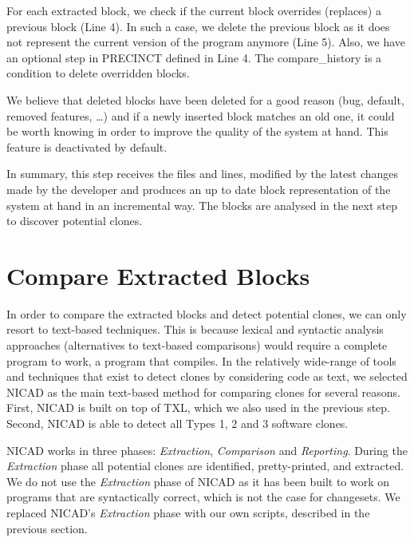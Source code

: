 For each extracted block, we check if the current block overrides (replaces) a previous block (Line 4).
In such a case, we delete the previous block as it does not represent the current version of the program anymore (Line 5).
Also, we have an optional step in PRECINCT defined in Line 4. The compare\_history is a condition to delete overridden blocks.

We believe that deleted blocks have been deleted for a good reason (bug, default, removed features, \ldots) and if a newly inserted block matches an old one, it could be worth knowing in order to improve the quality of the system at hand.
This feature is deactivated by default.

In summary, this step receives the files and lines, modified by the latest changes made by the developer and produces an up to date block representation of the system at hand in an incremental way.
The blocks are analysed in the next step to discover potential clones.

\section{Compare Extracted Blocks}
\label{sub:Compare Extracted Blocks}

In order to compare the extracted blocks and detect potential clones, we can only resort to text-based techniques.
This is because lexical and syntactic analysis approaches (alternatives to text-based comparisons) would require a complete program to work, a program that compiles.
In the relatively wide-range of tools and techniques that exist to detect clones by considering code as text\cite{Johnson1993,Johnson1994,Marcus,Manber1994,StephaneDucasse,Wettel2005}, we selected NICAD as the main text-based method for comparing clones \cite{Cordy2011} for several reasons.
First, NICAD is built on top of TXL, which we also used in the previous step.
Second, NICAD is able to detect all Types 1, 2 and 3 software clones.

NICAD  works in three phases: \textit{Extraction}, \textit{Comparison} and \textit{Reporting}. During the \textit{Extraction} phase all potential clones are identified, pretty-printed, and extracted.
We do not use the \textit{Extraction} phase of NICAD as it has been built to work on programs that are syntactically correct, which is not the case for changesets.
We replaced NICAD's \textit{Extraction} phase with our own scripts, described in the previous section.


